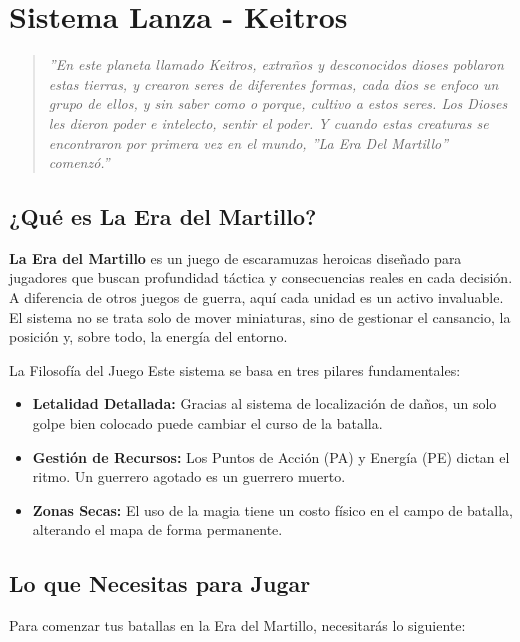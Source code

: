 
\chapter{Sistema Lanza - Keitros}

\begin{quote}
\textit{''En este planeta llamado Keitros, extraños y desconocidos dioses poblaron estas tierras, y crearon seres de diferentes formas, cada dios se enfoco un grupo de ellos, y sin saber como o porque, cultivo a estos seres. Los Dioses les dieron poder e intelecto, sentir el poder. Y cuando estas creaturas se encontraron por primera vez en el mundo, ''La Era Del Martillo'' comenzó.''}
\end{quote}


\section{¿Qué es La Era del Martillo?}
\textbf{La Era del Martillo} es un juego de escaramuzas heroicas diseñado para jugadores que buscan profundidad táctica y consecuencias reales en cada decisión. A diferencia de otros juegos de guerra, aquí cada unidad es un activo invaluable. El sistema no se trata solo de mover miniaturas, sino de gestionar el cansancio, la posición y, sobre todo, la energía del entorno.

\begin{reglaespecial}{La Filosofía del Juego}
Este sistema se basa en tres pilares fundamentales:
\begin{itemize}
    \item \textbf{Letalidad Detallada:} Gracias al sistema de localización de daños, un solo golpe bien colocado puede cambiar el curso de la batalla.
    \item \textbf{Gestión de Recursos:} Los Puntos de Acción (PA) y Energía (PE) dictan el ritmo. Un guerrero agotado es un guerrero muerto.
    \item \textbf{Zonas Secas:} El uso de la magia tiene un costo físico en el campo de batalla, alterando el mapa de forma permanente.
\end{itemize}
\end{reglaespecial}

\section{Lo que Necesitas para Jugar}
Para comenzar tus batallas en la Era del Martillo, necesitarás lo siguiente:

